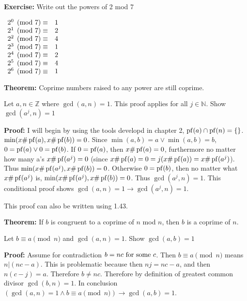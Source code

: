 \item \textbf{Exercise:} Write out the powers of 2 mod 7

\(
\begin{array}[t]{ll}
2^0 \pmod 7 \equiv & 1 \\
2^1 \pmod 7 \equiv & 2 \\
2^2 \pmod 7 \equiv & 4 \\
2^3 \pmod 7 \equiv & 1 \\
2^4 \pmod 7 \equiv & 2 \\
2^5 \pmod 7 \equiv & 4 \\
2^6 \pmod 7 \equiv & 1 \\
\end{array}
\)

\item \textbf{Theorem:} Coprime numbers raised to any power are still coprime.

Let \(a, n \in \mathbb Z\) where \(\gcd(a, n) = 1\). This proof applies for all \(j \in \mathbb N\). Show \(\gcd(a^j, n) = 1\)

\textbf{Proof:} I will begin by using the tools developd in chapter 2, \(\operatorname{pf}(a) \cap \operatorname{pf}(n)  = \{\}\). \(\min (x \# \operatorname{pf}(a), x \# \operatorname{pf}(b)) = 0\). Since \(\min(a, b) = a \vee \min(a, b) = b\), \(0 = \operatorname{pf}(a) \vee 0 = \operatorname{pf}(b)\). If \(0 = \operatorname{pf}(a)\), then \(x \# \operatorname{pf}(a) = 0\), furthermore no matter how many a's \(x \# \operatorname{pf}(a^j) = 0\) (since \(x \# \operatorname{pf}(a) = 0 = j (x \# \operatorname{pf}(a)) = x \# \operatorname{pf}(a^j)\)). Thus \(\min(x \# \operatorname{pf}(a^j), x \# \operatorname{pf}(b)) = 0\). Otherwise \(0 = \operatorname{pf}(b)\), then no matter what \(x \# \operatorname{pf}(a^j)\) is, \(\min(x \# \operatorname{pf}(a^j), x \# \operatorname{pf}(b)) = 0\). Thus \(\gcd(a^j, n) = 1\). This conditional proof shows \(\gcd(a, n) = 1 \rightarrow \gcd(a^j, n) = 1\). \qedhere

This proof can also be written using 1.43.

\item \textbf{Theorem:} If \(b\) is congruent to a coprime of \(n\) mod \(n\), then \(b\) is a coprime of \(n\).

Let \(b \equiv a \pmod n\) and \(\gcd(a, n) = 1\). Show \(\gcd(a, b) = 1\)

\textbf{Proof:} Assume for contradiction \(b = n c \textrm{\ for some\ } c\). Then \(b \equiv a \pmod n\) means \(n | (nc - a)\). This is problematic because then \(nj = nc - a\), and then \(n(c-j) = a\). Therefore \(b \neq nc\). Therefore by definition of greatest common divisor \(\gcd(b, n) = 1\). In conclusion \((\gcd(a, n) = 1 \wedge b \equiv a \pmod n) \rightarrow \gcd(a, b) = 1\). \qedhere

